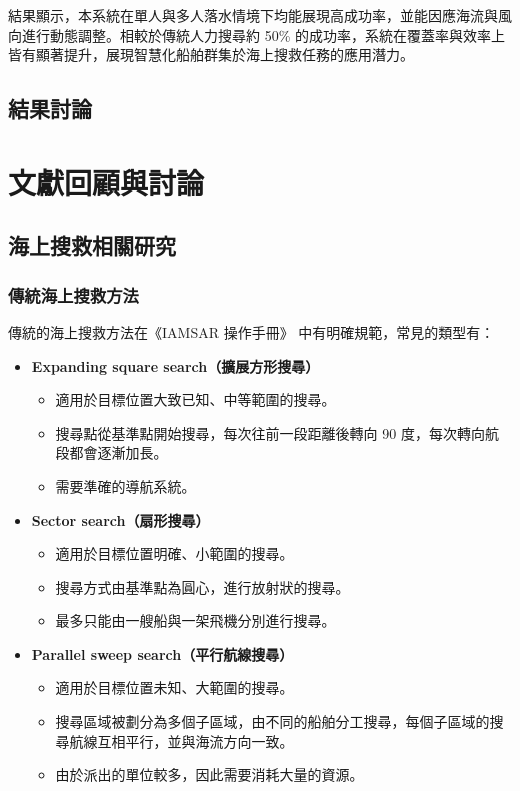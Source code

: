 \documentclass[12pt,a4paper]{article}
\begin{document}
結果顯示，本系統在單人與多人落水情境下均能展現高成功率，並能因應海流與風向進行動態調整。相較於傳統人力搜尋約 50\% 的成功率，系統在覆蓋率與效率上皆有顯著提升，展現智慧化船舶群集於海上搜救任務的應用潛力。


\subsection{結果討論}

\newpage

\section{文獻回顧與討論}

\subsection{海上搜救相關研究}

\subsubsection{傳統海上搜救方法}
傳統的海上搜救方法在《IAMSAR 操作手冊》\cite{IAMSAR2008} 中有明確規範，常見的類型有：
\begin{itemize}
	\item \textbf{Expanding square search（擴展方形搜尋）}
	\begin{itemize}
		\item 適用於目標位置大致已知、中等範圍的搜尋。
		\item 搜尋點從基準點開始搜尋，每次往前一段距離後轉向 90 度，每次轉向航段都會逐漸加長。
		\item 需要準確的導航系統。
	\end{itemize}
	\item \textbf{Sector search（扇形搜尋）}
	\begin{itemize}
		\item 適用於目標位置明確、小範圍的搜尋。
		\item 搜尋方式由基準點為圓心，進行放射狀的搜尋。
		\item 最多只能由一艘船與一架飛機分別進行搜尋。
	\end{itemize}
	\item \textbf{Parallel sweep search（平行航線搜尋）}
	\begin{itemize}
		\item 適用於目標位置未知、大範圍的搜尋。
		\item 搜尋區域被劃分為多個子區域，由不同的船舶分工搜尋，每個子區域的搜尋航線互相平行，並與海流方向一致。
		\item 由於派出的單位較多，因此需要消耗大量的資源。
	\end{itemize}
\end{itemize}
\end{document}
